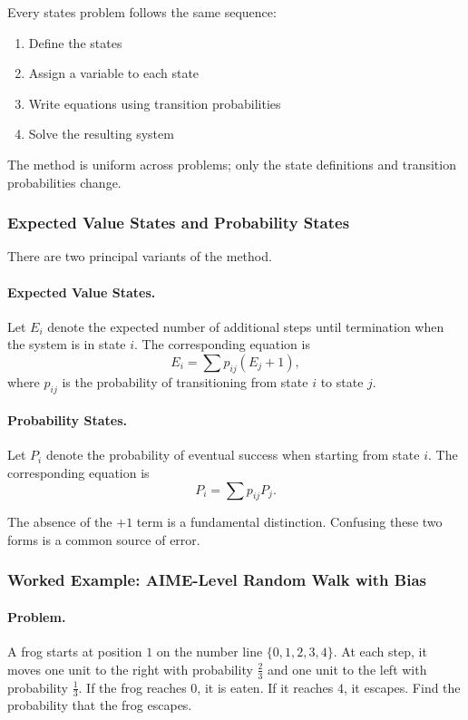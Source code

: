 \documentclass[12pt]{extarticle}
\begin{document}
Every states problem follows the same sequence:
\begin{enumerate}
    \item Define the states
    \item Assign a variable to each state
    \item Write equations using transition probabilities
    \item Solve the resulting system
\end{enumerate}

The method is uniform across problems; only the state definitions and transition probabilities change.

\subsubsection*{Expected Value States and Probability States}

There are two principal variants of the method.

\paragraph{Expected Value States.}
Let $E_i$ denote the expected number of additional steps until termination when the system is in state $i$. The corresponding equation is
\[
E_i = \sum p_{ij}(E_j + 1),
\]
where $p_{ij}$ is the probability of transitioning from state $i$ to state $j$.

\paragraph{Probability States.}
Let $P_i$ denote the probability of eventual success when starting from state $i$. The corresponding equation is
\[
P_i = \sum p_{ij} P_j.
\]

The absence of the $+1$ term is a fundamental distinction. Confusing these two forms is a common source of error.

\subsubsection*{Worked Example: AIME-Level Random Walk with Bias}

\paragraph{Problem.}
A frog starts at position $1$ on the number line $\{0,1,2,3,4\}$. At each step, it moves one unit to the right with probability $\tfrac{2}{3}$ and one unit to the left with probability $\tfrac{1}{3}$. If the frog reaches $0$, it is eaten. If it reaches $4$, it escapes. Find the probability that the frog escapes.
\end{document}

